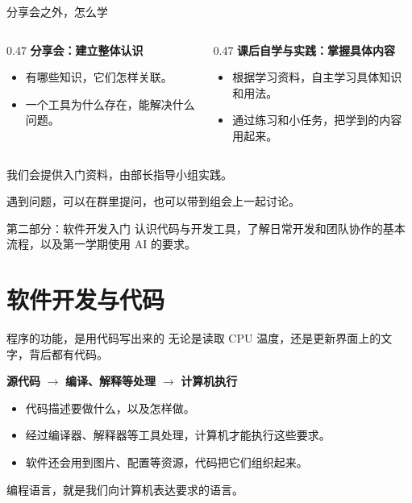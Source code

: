 \documentclass[aspectratio=169]{beamer}
\begin{document}
\begin{frame}{分享会之外，怎么学}
  \begin{columns}[T,onlytextwidth]
    \begin{column}{0.47\textwidth}
      \textbf{分享会：建立整体认识}
      \medskip
      \begin{itemize}
        \item 有哪些知识，它们怎样关联。
        \item 一个工具为什么存在，能解决什么问题。
      \end{itemize}
    \end{column}
    \begin{column}{0.47\textwidth}
      \textbf{课后自学与实践：掌握具体内容}
      \medskip
      \begin{itemize}
        \item 根据学习资料，自主学习具体知识和用法。
        \item 通过练习和小任务，把学到的内容用起来。
      \end{itemize}
    \end{column}
  \end{columns}
  \bigskip
  \bigskip
  我们会提供入门资料，由部长指导小组实践。
  \par\medskip
  \alert{遇到问题，可以在群里提问，也可以带到组会上一起讨论。}
\end{frame}

\begin{frame}{第二部分：软件开发入门}
  认识代码与开发工具，了解日常开发和团队协作的基本流程，以及第一学期使用 AI 的要求。
\end{frame}

\section{软件开发与代码}

\begin{frame}{程序的功能，是用代码写出来的}
  无论是读取 CPU 温度，还是更新界面上的文字，背后都有代码。
  \par\bigskip
  \begin{center}
    \textbf{源代码}
    \quad $\longrightarrow$ \quad
    \textbf{编译、解释等处理}
    \quad $\longrightarrow$ \quad
    \textbf{计算机执行}
  \end{center}
  \bigskip
  \begin{itemize}
    \item 代码描述要做什么，以及怎样做。
    \item 经过编译器、解释器等工具处理，计算机才能执行这些要求。
    \item 软件还会用到图片、配置等资源，代码把它们组织起来。
  \end{itemize}
  \bigskip
  \alert{编程语言，就是我们向计算机表达要求的语言。}
\end{frame}
\end{document}
